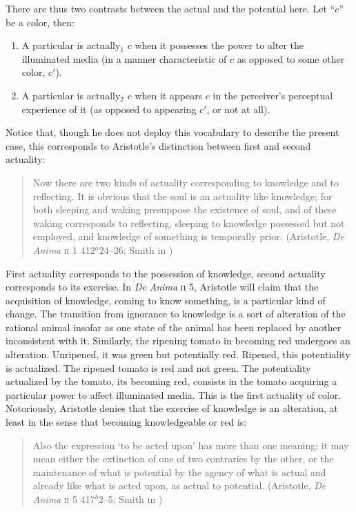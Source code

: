 There are thus two contrasts between the actual and the potential here. Let ``\( c \)'' be a color, then:
\begin{enumerate}[(1)]
	\item A particular is actually\( _{1} \) \( c \) when it possesses the power to alter the illuminated media (in a manner characteristic of \( c \) as opposed to some other color, \( c' \)).
	\item A particular is actually\( _{2} \) \( c \) when it appears \( c \) in the perceiver's perceptual experience of it (as opposed to appearing \( c' \), or not at all).
\end{enumerate}

Notice that, though he does not deploy this vocabulary to describe the present case, this corresponds to Aristotle's distinction between first and second actuality:
\begin{quote}
	Now there are two kinds of actuality corresponding to knowledge and to reflecting. It is obvious that the soul is an actuality like knowledge; for both sleeping and waking presuppose the existence of soul, and of these waking corresponds to reflecting, sleeping to knowledge possessed but not employed, and knowledge of something is temporally prior. (Aristotle, \emph{De Anima} \textsc{ii} 1 412\( ^{a} \)24--26; Smith in \citealt[21]{Barnes:1984uq})
\end{quote}
First actuality corresponds to the possession of knowledge, second actuality corresponds to its exercise. In \emph{De Anima} \textsc{ii} 5, Aristotle will claim that the acquisition of knowledge, coming to know something, is a particular kind of change. The transition from ignorance to knowledge is a sort of alteration of the rational animal insofar as one state of the animal has been replaced by another inconsistent with it. Similarly, the ripening tomato in becoming red undergoes an alteration. Unripened, it was green but potentially red. Ripened, this potentiality is actualized. The ripened tomato is red and not green. The potentiality actualized by the tomato, its becoming red, consists in the tomato acquiring a particular power to affect illuminated media. This is the first actuality of color. Notoriously, Aristotle denies that the exercise of knowledge is an alteration, at least in the sense that becoming knowledgeable or red is:
\begin{quote}
	 Also the expression ‘to be acted upon’ has more than one meaning; it may mean either the extinction of one of two contraries by the other, or the maintenance of what is potential by the agency of what is actual and already like what is acted upon, as actual to potential. (Aristotle, \emph{De Anima} \textsc{ii} 5 417\( ^{b} \)2--5; Smith in \citealt[30]{Barnes:1984uq})
\end{quote}
